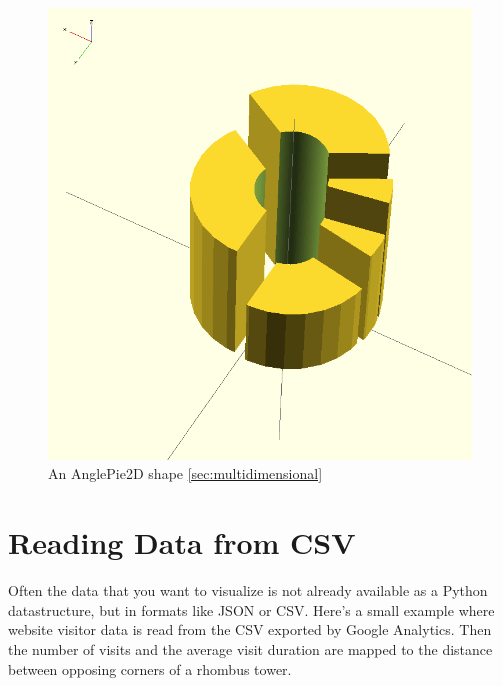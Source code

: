 \begin{figure}[H]
	\centering
	\includegraphics[height=.3\textheight]{images/angle_pie.png}
	\caption{An AnglePie2D shape \eqref{sec:multidimensional}}
	\label{img:angle_pie}
\end{figure}


\newpage
\section{Reading Data from CSV}\label{sec:csv}

Often the data that you want to visualize is not already available as a Python
datastructure, but in formats like JSON or CSV. Here's a small example where
website visitor data is read from the CSV exported by Google Analytics. Then the
number of visits and the average visit duration are mapped to the distance
between opposing corners of a rhombus tower.

